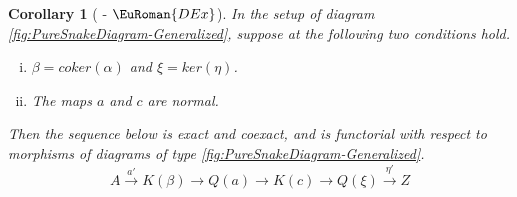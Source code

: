 \documentclass [12pt,oneside]{book}%
\theoremstyle{captionstyle}  %
\newtheorem{corollary}[theorem]{Corollary}
\newenvironment{thmlist}{		%
	\begin{enumerate}[(i)]}{
	\end{enumerate}
}
\newcommand{\XRA}[1]{\xrightarrow{\ #1\ }}
\newcommand{\Ker}[1]{\textit{K}(#1)}		     	%
\newcommand{\KerMap}[1]{\textit{ker}(#1)}		     	%
\newcommand{\CoKer}[1]{\textit{Q}(#1)}               %
\newcommand{\CoKerMap}[1]{\textit{coker}(#1)}						        %
\newcommand{\DExTag}{ - {\color{Cerulean} $\EuRoman{DEx}$}}			%
\begin{document}
\begin{corollary}[\DExTag]
    \label{thm:PureSnake-Generalized-II}%
    In the setup of diagram \eqref{fig:PureSnakeDiagram-Generalized}, suppose at the following two conditions hold.
    \begin{thmlist}
        \item $\beta=\CoKerMap{\alpha}$ and $\xi=\KerMap{\eta}$.
        \item The maps $a$ and $c$ are normal.
    \end{thmlist}
    Then the sequence below is exact and coexact, and is functorial with respect to morphisms of diagrams of type \eqref{fig:PureSnakeDiagram-Generalized}.
    \begin{equation*}
        A \XRA{a'} \Ker{\beta} \longrightarrow \CoKer{a} \longrightarrow \Ker{c} \longrightarrow \CoKer{\xi} \XRA{\eta'} Z
    \end{equation*}
\end{corollary}
\end{document}
